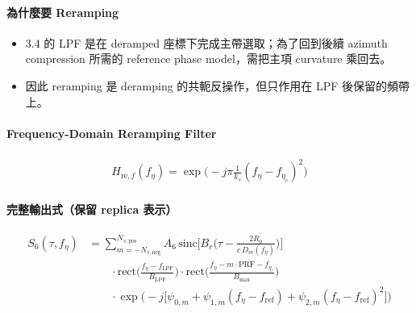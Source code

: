 \documentclass[10pt]{article}
\providecommand{\tightlist}{%
  \setlength{\itemsep}{0pt}\setlength{\parskip}{0pt}}
\begin{document}
\hypertarget{ux70baux4ec0ux9ebcux8981-reramping}{%
\paragraph{為什麼要
Reramping}\label{ux70baux4ec0ux9ebcux8981-reramping}}

\begin{itemize}
\tightlist
\item
  3.4 的 LPF 是在 deramped 座標下完成主帶選取；為了回到後續 azimuth
  compression 所需的 reference phase model，需把主項 curvature 乘回去。
\item
  因此 reramping 是 deramping 的共軛反操作，但只作用在 LPF
  後保留的頻帶上。
\end{itemize}

\hypertarget{frequency-domain-reramping-filter}{%
\paragraph{Frequency-Domain Reramping
Filter}\label{frequency-domain-reramping-filter}}

\begin{equation}
\begin{aligned}
H_{\mathrm{re},f}(f_\eta)=\exp\biggl(-j\pi\frac{1}{k_s}(f_\eta-f_{\eta_c})^2\biggr)
\end{aligned}
\end{equation}

\hypertarget{ux5b8cux6574ux8f38ux51faux5f0fux4fddux7559-replica-ux8868ux793a-1}{%
\paragraph{完整輸出式（保留 replica
表示）}\label{ux5b8cux6574ux8f38ux51faux5f0fux4fddux7559-replica-ux8868ux793a-1}}

\begin{equation}
\begin{aligned}
S_6(\tau,f_\eta)
&=
\sum_{m=-N_{s,\mathrm{neg}}}^{N_{s,\mathrm{pos}}} A_6\,
\mathrm{sinc}\biggl[ B_r\biggl( \tau-\frac{2R_0}{c\,D_m(f_\eta)} \biggr) \biggr]\\
&\qquad \cdot \mathrm{rect}\biggl( \frac{f_\eta-f_{\mathrm{LPF}}}{B_{\mathrm{LPF}}} \biggr)
\cdot \mathrm{rect}\biggl( \frac{f_\eta-m\cdot\mathrm{PRF}-f_{\eta_c}}{B_{\max}} \biggr)\\
&\qquad \cdot \exp\biggl( -j\biggl[ \psi_{0,m}+\psi_{1,m}(f_\eta-f_{\mathrm{ref}})+\psi_{2,m}(f_\eta-f_{\mathrm{ref}})^2 \biggr] \biggr)
\end{aligned}
\end{equation}
\end{document}
